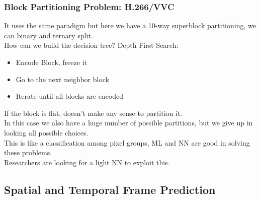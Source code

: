\subsubsection{Block Partitioning Problem: H.266/VVC}
It uses the same paradigm but here we have a 10-way superblock partitioning, we can binary and ternary split.\\
How can we build the decision tree? Depth First Search:
\begin{itemize}
    \item Encode Block, freeze it
    \item Go to the next neighbor block
    \item Iterate until all blocks are encoded
\end{itemize}
If the block is flat, doesn't make any sense to partition it.\\
In this case we also have a huge number of possible partitions, but we give up in looking all possible choices.\\
This is like a classification among pixel groups, ML and NN are good in solving these problems.\\
Researchers are looking for a light NN to exploit this.
\subsection{Spatial and Temporal Frame Prediction}
